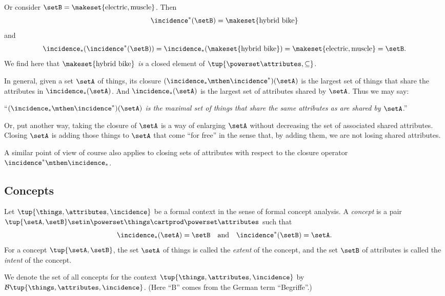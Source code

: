 Or consider $\setB = \makeset{\text{electric}, \text{muscle}}$. Then
\begin{equation}
\incidence^*(\setB) = \makeset{\text{hybrid bike}}
\end{equation}
and 
\begin{equation}
\incidence_*(\incidence^*(\setB)) = \incidence_*(\makeset{\text{hybrid bike}}) = \makeset{\text{electric}, \text{muscle}} = \setB.
\end{equation}
We find here that $\makeset{\text{hybrid bike}}$ \emph{is} a closed element of $\tup{\powerset \attributes, \subseteq}$. 

In general, given a set $\setA$ of things, its closure $(\incidence_* \mthen \incidence^*)(\setA)$ is the largest set of things that share the attributes in $\incidence_*(\setA)$. And $\incidence_*(\setA)$ is the largest set of attributes shared by $\setA$. Thus we may say:

 ``\emph{$(\incidence_* \mthen \incidence^*)(\setA)$ is the maximal set of things that share the same attributes as are shared by $\setA$}.'' 
 
Or, put another way, taking the closure of $\setA$ is a way of enlarging $\setA$ without decreasing the set of associated shared attributes. Closing $\setA$ is adding those things to $\setA$ that come ``for free'' in the sense that, by adding them, we are not losing shared attributes. 

A similar point of view of course also applies to closing sets of attributes with respect to the closure operator $\incidence^* \mthen \incidence_*$.

\subsection{Concepts}

\begin{definition}
Let $\tup{\things, \attributes, \incidence}$ be a formal context in the sense of formal concept analysis. A \emph{concept} is a pair $\tup{\setA, \setB} \setin \powerset\things \cartprod \powerset\attributes$ such that 
\begin{equation}\label{eq:def-concept-equations}
\incidence_*(\setA) = \setB \quad \text{and} \quad \incidence^*(\setB) = \setA.
\end{equation}
For a concept $\tup{\setA, \setB}$, the set $\setA$ of things is called the \emph{extent} of the concept, and the set $\setB$ of attributes is called the \emph{intent} of the concept. 

We denote the set of all concepts for the context $\tup{\things, \attributes, \incidence}$ by $\mathcal{B}\tup{\things, \attributes, \incidence}$. (Here ``B'' comes from the German term ``Begriffe''.) 
\end{definition}

